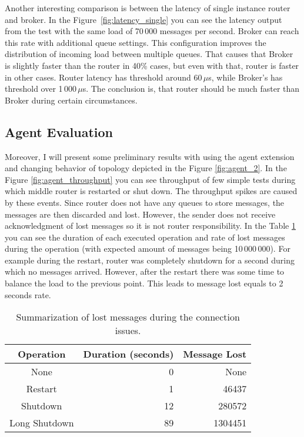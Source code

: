 \documentclass{ExcelAtFIT}
\begin{document}
Another interesting comparison is between the latency of single instance router and broker. In the Figure~\ref{fig:latency_single} you can see the latency output from the test with the same load of 70\,000 messages per second. Broker can reach this rate with additional queue settings. This configuration improves the distribution of incoming load between multiple queues. That causes that Broker is slightly faster than the router in 40\% cases, but even with that, router is faster in other cases. Router latency has threshold around 60\,$\mu$s, while Broker's has threshold over 1\,000\,$\mu$s. The conclusion is, that router should be much faster than Broker during certain circumstances.

\subsection{Agent Evaluation}
Moreover, I will present some preliminary results with using the agent extension and changing behavior of topology depicted in the Figure \ref{fig:agent_2}. In the Figure \ref{fig:agent_throughput} you can see throughput of few simple tests during which middle router is restarted or shut down. The throughput spikes are caused by these events. Since router does not have any queues to store messages, the messages are then discarded and lost. However, the sender does not receive acknowledgment of lost messages so it is not router responsibility. In the Table \ref{tab:agent} you can see the duration of each executed operation and rate of lost messages during the operation (with expected amount of messages being 10\,000\,000). For example during the restart, router was completely shutdown for a second during which no messages arrived. However, after the restart there was some time to balance the load to the previous point. This leads to message lost equals to 2 seconds rate.

\begin{table}[h]
\centering
\caption{Summarization of lost messages during the connection issues.}
\label{my-label}
\begin{tabular}{|c|r|r|}
\hline
\rowcolor[HTML]{C5E3DF}
Operation     & Duration (seconds) & Message Lost \\ \hline
None          & 0        & None         \\ \hline
Restart       & 1        & 46437        \\ \hline
Shutdown      & 12       & 280572       \\ \hline
Long Shutdown & 89       & 1304451      \\ \hline
\end{tabular}
\label{tab:agent}
\end{table}
\end{document}
